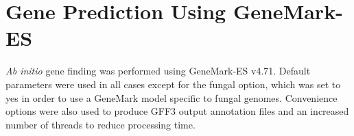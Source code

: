 




\section{Gene Prediction Using GeneMark-ES}

\textit{Ab initio} gene finding was performed using GeneMark-ES
v4.71\cite{Borodovsky2011}. Default parameters were used in all cases
except for the fungal option, which was set to yes in order to use a
GeneMark model specific to fungal genomes. Convenience options were
also used to produce GFF3 output annotation files and an increased
number of threads to reduce processing time.

